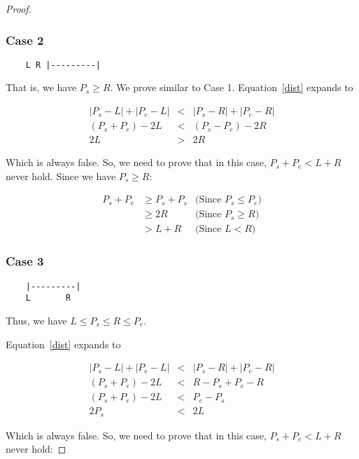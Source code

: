 \documentclass[a4paper]{article}
\begin{document}
\begin{proof}
    \subsubsection*{Case 2}

    \begin{verbatim}
    L R |---------|
    \end{verbatim}

    That is, we have $P_s \ge R$. We prove similar to Case 1.
    Equation~\ref{dist} expands to

    \begin{eqnarray*}
        |P_s - L| + |P_e - L| &<& |P_s - R| + |P_e - R| \\
        (P_s + P_e) - 2L &<& (P_s - P_e) - 2R\\
        2L &>& 2R
    \end{eqnarray*}

    Which is always false. So, we need to prove that in this case,
    $P_s + P_e < L+R$ never hold. Since we have $P_s \ge R$:

    \begin{eqnarray*}
        P_s + P_e &\ge P_s + P_s & \text{(Since $P_s \le P_e$)} \\
        &\ge 2R & \text{(Since $P_s \ge R$)} \\
        &> L + R & \text{(Since $L < R$)}
    \end{eqnarray*}

    \subsubsection*{Case 3}

    \begin{verbatim}
    |---------|
    L       R
    \end{verbatim}

    Thus, we have $L \le P_s \le R \le P_e$.

    Equation~\ref{dist} expands to

    \begin{eqnarray*}
        |P_s - L| + |P_e - L| &<& |P_s - R| + |P_e - R| \\
        (P_s + P_e) - 2L &<& R - P_s + P_e - R \\
        (P_s + P_e) - 2L &<& P_e - P_s \\
        2P_s &<& 2L
    \end{eqnarray*}

    Which is always false. So, we need to prove that in this case,
    $P_s + P_e < L+R$ never hold:


\end{proof}
\end{document}

